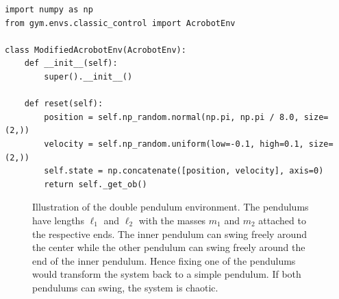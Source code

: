 			\begin{lstlisting}[caption={Modification of Gym's acrobot environment to start at the top instead of hanging down.}, label=lst:topAcrobot]
import numpy as np
from gym.envs.classic_control import AcrobotEnv

class ModifiedAcrobotEnv(AcrobotEnv):
	def __init__(self):
		super().__init__()

	def reset(self):
		position = self.np_random.normal(np.pi, np.pi / 8.0, size=(2,))
		velocity = self.np_random.uniform(low=-0.1, high=0.1, size=(2,))
		self.state = np.concatenate([position, velocity], axis=0)
		return self._get_ob()
			\end{lstlisting}

			\begin{figure}
				\centering
				\tikzDoublePendulum
				\caption{Illustration of the double pendulum environment. The pendulums have lengths \(\ell_1\) and \(\ell_2\) with the masses \(m_1\) and \(m_2\) attached to the respective ends. The inner pendulum can swing freely around the center while the other pendulum can swing freely around the end of the inner pendulum. Hence fixing one of the pendulums would transform the system back to a simple pendulum. If both pendulums can swing, the system is chaotic.}
				\label{fig:envDoublePendulumGymSketch}
			\end{figure}


